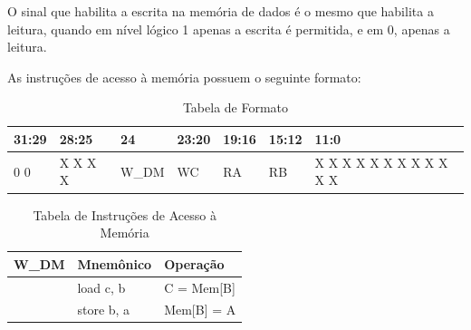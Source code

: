 \documentclass{report}
\begin{document}
O sinal que habilita a escrita na memória de dados é o mesmo que habilita a leitura, quando em nível lógico 1 apenas a escrita é permitida, e em 0, apenas a leitura.

As instruções de acesso à memória possuem o seguinte formato:

\FloatBarrier
\begin{table}[H]
  \begin{center}
  \renewcommand{\arraystretch}{1.2}
    \begin{tabular}[pos]{|>{\centering\arraybackslash}m{30pt}|>{\centering\arraybackslash}m{42pt}|>{\centering\arraybackslash}m{42pt}|>{\centering\arraybackslash}m{35pt}|>{\centering\arraybackslash}m{35pt}|>{\centering\arraybackslash}m{35pt}|>{\centering\arraybackslash}m{121pt}|} \hline
      \cellcolor[gray]{0.9}\textbf{31:29} & 
      \cellcolor[gray]{0.9}\textbf{28:25} & 
      \cellcolor[gray]{0.9}\textbf{24} & 
      \cellcolor[gray]{0.9}\textbf{23:20} & 
      \cellcolor[gray]{0.9}\textbf{19:16} & 
      \cellcolor[gray]{0.9}\textbf{15:12} & 
      \cellcolor[gray]{0.9}\textbf{11:0} \\ \hline
      1 0 0         & X X X X &W\_DM & WC        & RA        & RB        & X X X X X X X X X X X X \\ \hline
    \end{tabular}
    \caption{Tabela de Formato}
    \end{center}
\end{table}  

\FloatBarrier
\begin{table}[H]
  \begin{center}
  \renewcommand{\arraystretch}{1.2}
    \begin{tabular}[pos]{|>{\centering\arraybackslash}m{79pt}|>{\centering\arraybackslash}m{150pt}|>{\centering\arraybackslash}m{160pt}|} \hline
      \cellcolor[gray]{0.9}\textbf{W\_DM} & \cellcolor[gray]{0.9}\textbf{Mnemônico} & \cellcolor[gray]{0.9}\textbf{Operação} \\ \hline
        0       & load c, b         & C = Mem[B] \\ \hline
        1       & store b, a        & Mem[B] = A \\ \hline
    \end{tabular}
    \caption{Tabela de Instruções de Acesso à Memória}
  \end{center}
\end{table}  
\end{document}
